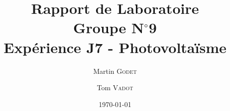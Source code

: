 \documentclass[a4paper, 12pt, oneside]{article}
\begin{document}
\title{Rapport de Laboratoire\\Groupe N$^\circ$9\\Expérience J7 - Photovoltaïsme}
\author{Martin \textsc{Godet} \and Tom \textsc{Vadot}}
\date{\today}

\maketitle









\nocite{*}  %
\printbibliography

\newpage

\begin{appendices}

\end{appendices}
\end{document}
